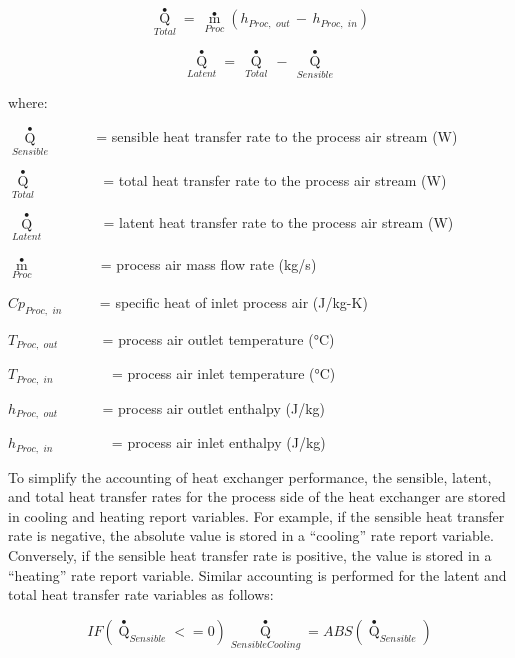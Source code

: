 \begin{equation}
{\mathop Q\limits^ \bullet_{Total}} = \,{\mathop m\limits^ \bullet_{Proc}}\left( {{h_{Proc,\,\,out}}\, - \,{h_{Proc,\,\,in}}} \right)
\end{equation}

\begin{equation}
{\mathop Q\limits^ \bullet_{Latent}} = \,{\mathop Q\limits^ \bullet_{Total}}\, - \,{\mathop Q\limits^ \bullet_{Sensible}}
\end{equation}

where:

\({\mathop Q\limits^ \bullet_{Sensible}}\) ~~~~~ = sensible heat transfer rate to the process air stream (W)

\({\mathop Q\limits^ \bullet_{Total}}\) ~~~~~~~~ = total heat transfer rate to the process air stream (W)

\({\mathop Q\limits^ \bullet_{Latent}}\) ~~~~~~~ = latent heat transfer rate to the process air stream (W)

\({\mathop m\limits^ \bullet_{Proc}}\) ~~~~~~~~ = process air mass flow rate (kg/s)

\(C{p_{Proc,\,\,in}}\) ~~~~ = specific heat of inlet process air (J/kg-K)

\({T_{Proc,\,\,out}}\) ~~~~~ = process air outlet temperature (°C)

\({T_{Proc,\,\,in}}\) ~~~~~~~ = process air inlet temperature (°C)

\({h_{Proc,\,\,out}}\) ~~~~~ = process air outlet enthalpy (J/kg)

\({h_{Proc,\,\,in}}\) ~~~~~~~ = process air inlet enthalpy (J/kg)

To simplify the accounting of heat exchanger performance, the sensible, latent, and total heat transfer rates for the process side of the heat exchanger are stored in cooling and heating report variables. For example, if the sensible heat transfer rate is negative, the absolute value is stored in a ``cooling'' rate report variable. Conversely, if the sensible heat transfer rate is positive, the value is stored in a ``heating'' rate report variable. Similar accounting is performed for the latent and total heat transfer rate variables as follows:

\begin{equation}
IF\left( {{{\mathop Q\limits^ \bullet  }_{Sensible}} <  = 0} \right){\mathop Q\limits^ \bullet_{SensibleCooling}} = ABS\left( {{{\mathop Q\limits^ \bullet  }_{Sensible}}} \right)
\end{equation}

